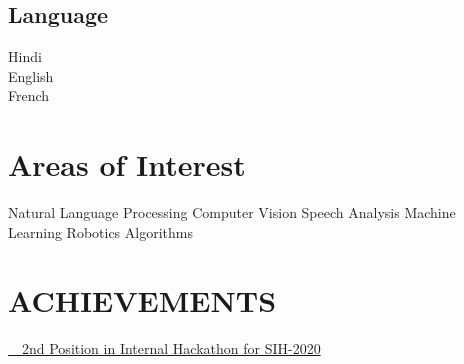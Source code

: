 \documentclass[]{deedy-resume-openfont}
\begin{document}
\newpage
\begin{minipage}[t]{0.33\textwidth}

\subsection{Language}
 Hindi\\
 English\\
 French\\

\section{Areas of Interest}
 Natural Language Processing \textbullet{} Computer Vision \textbullet{} Speech Analysis \textbullet{} Machine Learning \textbullet{} Robotics \textbullet{} Algorithms

\section{ACHIEVEMENTS} 
    \item {\href{https://drive.google.com/file/d/1YIRLa9Qt6k5Ax9tsddHiwMv6BL78XteQ/view?usp=sharing}{{\faTrophy\ \ 2nd Position in Internal Hackathon for SIH-2020}}}
\sectionsep
\end{minipage}
\hfill
\end{document}
